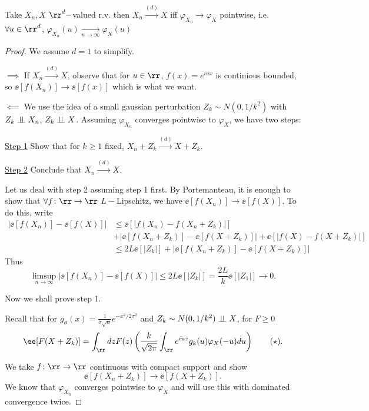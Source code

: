 \documentclass[../main.tex]{subfiles}
\begin{document}
\begin{theorem}
  [Lévy] Take $X_n, X$ $\rr^d-$valued r.v. then $X_n
  \overset{(d)}{\longrightarrow} X$ iff $\varphi_{X_n}
  \to \varphi_X$ pointwise, i.e. $\forall u \in \rr^d$,
  $\varphi_{X_n}(u) \underset{n \to \infty}{\longrightarrow} \varphi_{X}(u)$
\end{theorem} 
\begin{proof}
    We assume $d=1$ to simplify. 

    $\boxed{\implies}$ If $X_n \overset{(d)}{\longrightarrow} X$, observe that
    for $u \in \rr$, $f(x) = e^{iux}$ is continious bounded, so $\ee[f(X_n)]
    \to \ee[f(x)]$ which is what we want.

    $\boxed{\impliedby}$ We use the idea of a small gaussian perturbation $Z_k
    \sim N(0, 1/k^2)$ with $Z_k \perp\!\!\!\!\,\perp X_n$, $Z_k \perp\!\!\!\!\,\perp X$. Assuming $\varphi_{X_n}$
    converges pointwise to $\varphi_X$, we have two steps:

    \underline{Step 1} Show that for $k \geq 1$ fixed, $X_n + Z_k
    \overset{(d)}{\longrightarrow} X + Z_k$.

    \underline{Step 2} Conclude that $X_n \overset{(d)}{\longrightarrow} X$.

    Let us deal with step 2 assuming step 1 first. By Portemanteau, it is enough
    to show that $\forall f \colon \rr \to \rr$ $L-$Lipschitz, we have
    $\ee[f(X_n)] \to \ee[f(X)]$. To do this, write
    \begin{align*}
      |\ee[f(X_n)] - \ee[f(X)]| &\leq \ee[|f(X_n) - f(X_n + Z_k)|] \\ &+ |\ee[f(X_n +
      Z_k)] - \ee[f(X + Z_k)]| + \ee[|f(X) - f(X + Z_k)|] \\
      &\leq 2L \ee[|Z_k|] + |\ee[f(X_n + Z_k)] - \ee[f(X + Z_k)]|
    \end{align*}
    Thus 
    \[
      \limsup_{n \to \infty} |\ee[f(X_n)] - \ee[f(X)]| \leq 2 L \ee[|Z_k|] =
      \frac{2L}{k} \ee[|Z_1|] \to 0
    .\] 

  Now we shall prove step 1.

  Recall that for $g_{\sigma}(x) = \frac{1}{\sigma \sqrt{n}} e^{-x^2/2
  \sigma^2}$ and $Z_k \sim N(0, 1/k^2) \perp\!\!\!\!\,\perp X$, for $F \geq 0$
  \[
    \ee[F(X + Z_k)] = \int_{\rr} dz F(z) \left( \frac{k}{\sqrt{2\pi}} \int_{\rr}
    e^{iuz} g_k(u) \varphi_X(-u) du \right) \tag*{($\star$)}
  .\] 

  We take $f\colon \rr \to \rr$ continuous with compact support and show 
  \[
    \ee[f(X_n + Z_k)] \to \ee[f(X + Z_k)]
  .\] 
We know that $\varphi_{X_n}$ converges pointwise to $\varphi_X$ and will use
  this with dominated convergence twice.


\end{proof}
\end{document}
